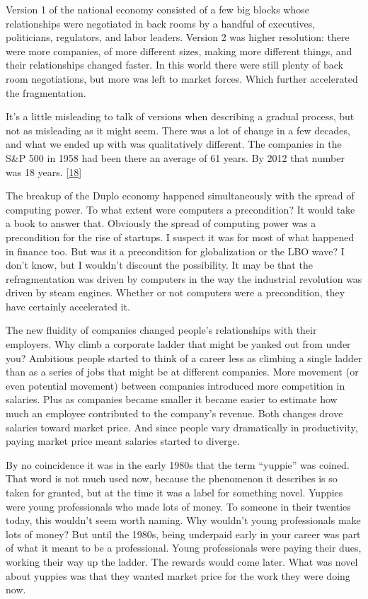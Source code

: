 Version 1 of the national economy consisted of a few big blocks whose
relationships were negotiated in back rooms by a handful of executives,
politicians, regulators, and labor leaders. Version 2 was higher
resolution: there were more companies, of more different sizes, making
more different things, and their relationships changed faster. In this
world there were still plenty of back room negotiations, but more was
left to market forces. Which further accelerated the fragmentation.

It's a little misleading to talk of versions when describing a gradual
process, but not as misleading as it might seem. There was a lot of
change in a few decades, and what we ended up with was qualitatively
different. The companies in the S\&P 500 in 1958 had been there an
average of 61 years. By 2012 that number was 18 years.
{[}\hyperref[f18n]{18}{]}

The breakup of the Duplo economy happened simultaneously with the spread
of computing power. To what extent were computers a precondition? It
would take a book to answer that. Obviously the spread of computing
power was a precondition for the rise of startups. I suspect it was for
most of what happened in finance too. But was it a precondition for
globalization or the LBO wave? I don't know, but I wouldn't discount the
possibility. It may be that the refragmentation was driven by computers
in the way the industrial revolution was driven by steam engines.
Whether or not computers were a precondition, they have certainly
accelerated it.

The new fluidity of companies changed people's relationships with their
employers. Why climb a corporate ladder that might be yanked out from
under you? Ambitious people started to think of a career less as
climbing a single ladder than as a series of jobs that might be at
different companies. More movement (or even potential movement) between
companies introduced more competition in salaries. Plus as companies
became smaller it became easier to estimate how much an employee
contributed to the company's revenue. Both changes drove salaries toward
market price. And since people vary dramatically in productivity, paying
market price meant salaries started to diverge.

By no coincidence it was in the early 1980s that the term ``yuppie'' was
coined. That word is not much used now, because the phenomenon it
describes is so taken for granted, but at the time it was a label for
something novel. Yuppies were young professionals who made lots of
money. To someone in their twenties today, this wouldn't seem worth
naming. Why wouldn't young professionals make lots of money? But until
the 1980s, being underpaid early in your career was part of what it
meant to be a professional. Young professionals were paying their dues,
working their way up the ladder. The rewards would come later. What was
novel about yuppies was that they wanted market price for the work they
were doing now.

